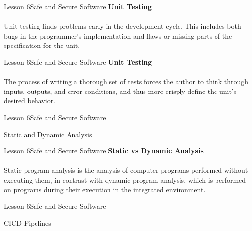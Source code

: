 \documentclass[aspectratio=1610]{beamer}
\begin{document}
\begin{frame}{Lesson 6}{Safe and Secure Software}
\LARGE
\textbf{Unit Testing}\\~\\ 
Unit testing finds problems early in the development cycle. This includes both bugs in 
the programmer's implementation and flaws or missing parts of the specification for the 
unit.
\end{frame}

\begin{frame}{Lesson 6}{Safe and Secure Software}
\LARGE
\textbf{Unit Testing}\\~\\ 
The process of writing a thorough set of tests forces the author to think through 
inputs, outputs, and error conditions, and thus more crisply define the unit's desired 
behavior.
\end{frame}



\begin{frame}{Lesson 6}{Safe and Secure Software}
\Huge
\begin{center}
Static and Dynamic Analysis
\end{center}
\end{frame}


\begin{frame}{Lesson 6}{Safe and Secure Software}
\LARGE
\textbf{Static vs Dynamic Analysis}\\~\\ 
Static program analysis is the analysis of computer programs performed without
executing them, in contrast with dynamic program analysis, which is performed on 
programs during their execution in the integrated environment.
\end{frame}




\begin{frame}{Lesson 6}{Safe and Secure Software}
\Huge
\begin{center}
CICD Pipelines
\end{center}
\end{frame}



\begin{frame}
\end{frame}
\end{document}
